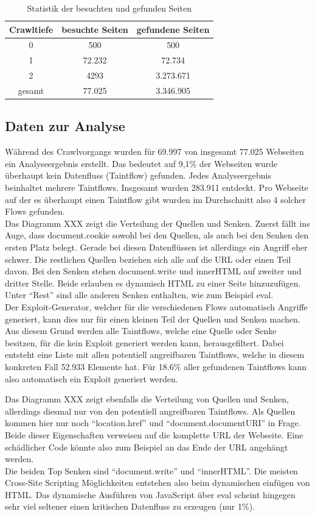 \begin{table}
\centering
\begin{tabular}{|c|c|c|}
	\hline 
	Crawltiefe & besuchte Seiten & gefundene Seiten \\ 
	\hline 
	0 & 500 & 500 \\ 
	\hline 
	1 & 72.232 & 72.734 \\ 
	\hline 
	2 & 4293 & 3.273.671 \\ 
	\hline 
	\hline
	gesamt  & 77.025 & 3.346.905 \\ 
	\hline 
\end{tabular} 
\caption{Statistik der besuchten und gefunden Seiten}
\end{table}

\subsection{Daten zur Analyse}
Während des Crawlvorgangs wurden für 69.997 von insgesamt 77.025 Webseiten ein Analyseergebnis erstellt. Das bedeutet auf 9,1\% der Webseiten wurde überhaupt kein Datenfluss (Taintflow) gefunden. Jedes Analyseergebnis beinhaltet mehrere Taintflows. Insgesamt wurden 283.911 entdeckt. Pro Webseite auf der es überhaupt einen Taintflow gibt wurden im Durchschnitt also 4 solcher Flows gefunden. \\
Das Diagramm XXX zeigt die Verteilung der Quellen und Senken. Zuerst fällt ins Auge, dass document.cookie sowohl bei den Quellen, als auch bei den Senken den ersten Platz belegt. Gerade bei diesen Datenflüssen ist allerdings ein Angriff eher schwer. Die restlichen Quellen beziehen sich alle auf die URL oder einen Teil davon. Bei den Senken stehen document.write und innerHTML auf zweiter und dritter Stelle. Beide erlauben es dynamisch HTML zu einer Seite hinzuzufügen. Unter \enquote{Rest} sind alle anderen Senken enthalten, wie zum Beispiel eval. \\
Der Exploit-Generator, welcher für die verschiedenen Flows automatisch Angriffe generiert, kann dies nur für einen kleinen Teil der Quellen und Senken machen. Aus diesem Grund werden alle Taintflows, welche eine Quelle oder Senke besitzen, für die kein Exploit generiert werden kann, herausgefiltert. Dabei entsteht eine Liste mit allen potentiell angreifbaren Taintflows, welche in diesem konkreten Fall 52.933 Elemente hat. Für 18.6\% aller gefundenen Taintflows kann also automatisch ein Exploit generiert werden. 

Das Diagramm XXX zeigt ebenfalls die Verteilung von Quellen und Senken, allerdings diesmal nur von den potentiell angreifbaren Taintflows. Als Quellen kommen hier nur noch \enquote{location.href} und \enquote{document.documentURI} in Frage. Beide dieser Eigenschaften verweisen auf die komplette URL der Webseite. Eine schädlicher Code könnte also zum Beispiel an das Ende der URL angehängt werden. \\
Die beiden Top Senken sind \enquote{document.write} und \enquote{innerHTML}. Die meisten Cross-Site Scripting Möglichkeiten entstehen also beim dynamischen einfügen von HTML. Das dynamische Ausführen von JavaScript über eval scheint hingegen sehr viel seltener einen kritischen Datenfluss zu erzeugen (nur 1\%). 

